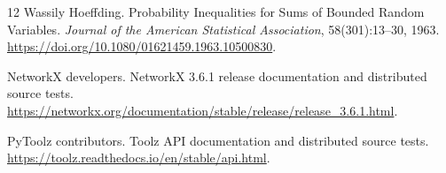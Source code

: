 \begin{thebibliography}{12}
 Wassily Hoeffding.
\newblock Probability Inequalities for Sums of Bounded Random Variables.
\newblock \emph{Journal of the American Statistical Association}, 58(301):13--30, 1963.
\newblock \url{https://doi.org/10.1080/01621459.1963.10500830}.

 NetworkX developers.
\newblock NetworkX 3.6.1 release documentation and distributed source tests.
\newblock \url{https://networkx.org/documentation/stable/release/release_3.6.1.html}.

 PyToolz contributors.
\newblock Toolz API documentation and distributed source tests.
\newblock \url{https://toolz.readthedocs.io/en/stable/api.html}.
\end{thebibliography}
